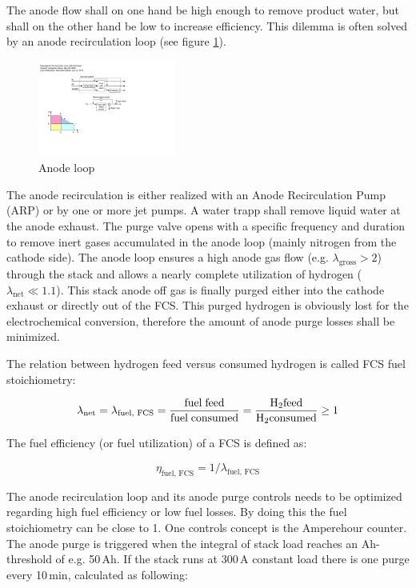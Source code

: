 \documentclass[11pt,a4paper,english,twoside]{scrreprt}
\begin{document}
The anode flow shall on one hand be high enough to remove product water, but shall on the other hand be low to increase efficiency. This dilemma is often solved by an anode recirculation loop (see figure \ref{fig:AnodeLoop}). 

\begin{figure}
  \centering
  \includegraphics*[width=0.4\textwidth,angle=0]{FCF_Figure_Anode_loop.pdf}
  \caption[Anode loop]{Anode loop}
  \label{fig:AnodeLoop}
\end{figure}  

The anode recirculation is either realized with an Anode Recirculation Pump (ARP) or by one or more jet pumps. A water trapp shall remove liquid water at the anode exhaust. The purge valve opens with a specific frequency and duration to remove inert gases accumulated in the anode loop (mainly nitrogen from the cathode side). The anode loop ensures a high anode gas flow (e.g. $\lambda_\text{gross}>2$) through the stack and allows a nearly complete utilization of hydrogen ($\lambda_\text{net} \ll 1.1$). This stack anode off gas is finally purged either into the cathode exhaust or directly out of the FCS. This purged hydrogen is obviously lost for the electrochemical conversion, therefore the amount of anode purge losses shall be minimized.

The relation between hydrogen feed versus consumed hydrogen is called FCS fuel stoichiometry:

\[
	\lambda_\text{net}=\lambda_\text{fuel, FCS} = \frac{\text{fuel\;feed}}{\text{fuel\;consumed}} = \frac{\ce{H2}\text{feed}}{\ce{H2}\text{consumed}} \ge 1
\]

The fuel efficiency (or fuel utilization) of a FCS is defined as:

\[\eta_\text{fuel, FCS} = 1/\lambda_\text{fuel, FCS} \]

The anode recirculation loop and its anode purge controls needs to be optimized regarding high fuel efficiency or low fuel losses. By doing this the fuel stoichiometry can be close to 1. One controls concept is the Amperehour counter. The anode purge is triggered when the integral of stack load reaches an Ah-threshold of e.g. 50\,Ah. If the stack runs at 300\,A constant load there is one purge every 10\,min, calculated as following:
\end{document}
